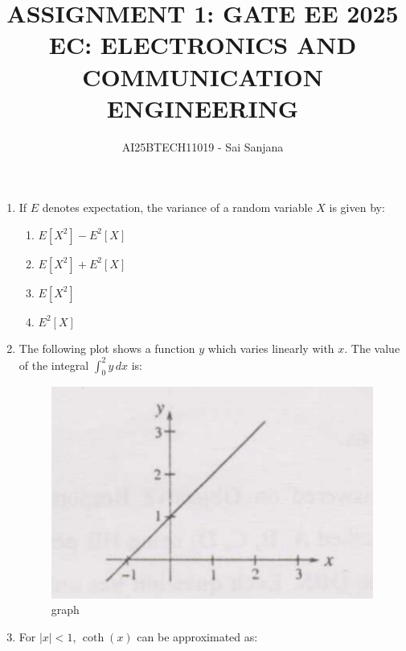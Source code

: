 \documentclass[journal,12pt,onecolumn]{IEEEtran}
\theoremstyle{remark}
\begin{document}
\title{
ASSIGNMENT 1: GATE EE 2025   \\
EC: ELECTRONICS AND COMMUNICATION ENGINEERING}
\author{AI25BTECH11019 - Sai Sanjana}
\maketitle
\renewcommand{\thefigure}{\theenumi}
\renewcommand{\thetable}{\theenumi}
\begin{enumerate}

\item If $ E $ denotes expectation, the variance of a random variable $ X $ is given by:
\hfill{}
\begin{enumerate}
    
    \item $ E[X^2] - E^2[X] $
    \item $ E[X^2] + E^2[X] $
    \item $ E[X^2] $
    \item $ E^2[X] $

\end{enumerate}


\item The following plot shows a function $y$ which varies linearly with $x$. The value of the integral $\int_{0}^{2} y \, dx$ is:
\hfill{}

\begin{figure}[H]
    \centering
    \includegraphics[width=0.4\columnwidth]{Q2.jpg}
    \caption*{graph}
    \label{fig:q8}
\end{figure}


\begin{enumerate}
\end{enumerate}


\item For $|x| < 1 $, $ \coth(x)$ can be approximated as: 
\hfill{}
\begin{enumerate}
\end{enumerate}


\end{enumerate}
\end{document}
